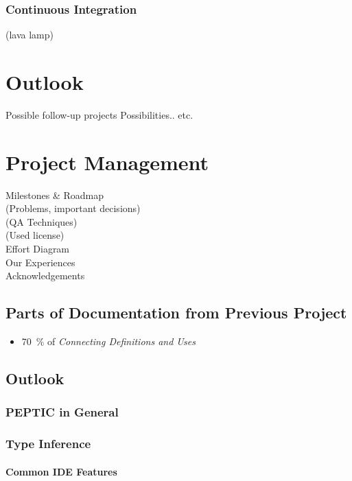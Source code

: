 \documentclass[12pt,halfparskip,DIV11,BCOR10mm]{scrreprt}
\begin{document}

\subsection{Continuous Integration}

  (lava lamp)


\chapter{Outlook}
 Possible follow-up projects
 Possibilities.. etc.

\chapter{Project Management}
 Milestones \& Roadmap \\
 (Problems, important decisions) \\
 (QA Techniques) \\
 (Used license) \\
 Effort Diagram \\
 Our Experiences \\
 Acknowledgements 



\section{Parts of Documentation from Previous Project}

\begin{itemize}
    \item 70~\% of \emph{Connecting Definitions and Uses} %
\end{itemize}

\section{Outlook}
\subsection{PEPTIC in General}
\subsection{Type Inference}
\subsubsection{Common IDE Features}
\end{document}
